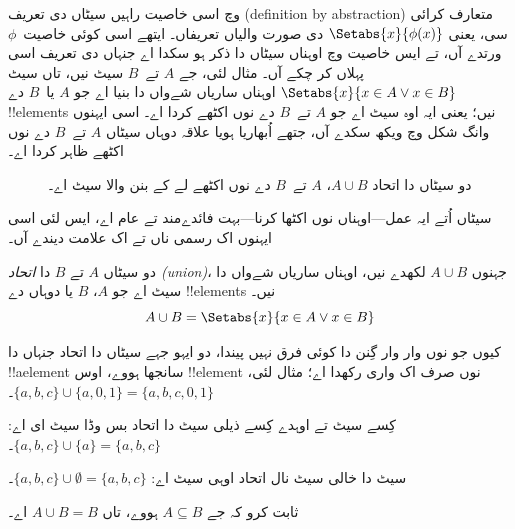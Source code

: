 \documentclass[../../../include/open-logic-section]{subfiles}
\begin{document}

\begin{explain}
 وچ اسی خاصیت راہیں سیٹاں دی تعریف
(definition by abstraction) متعارف کرائی
سی، یعنی $\Setabs{x}{\phi(x)}$ دی صورت والیاں تعریفاں۔ ایتھے اسی کوئی
خاصیت~$\phi$ ورتدے آں، تے ایس خاصیت وچ اوہناں سیٹاں دا ذکر ہو سکدا اے
جنہاں دی تعریف اسی پہلاں کر چکے آں۔ مثال لئی، جے $A$ تے~$B$ سیٹ نیں،
تاں سیٹ $\Setabs{x}{x \in A \lor x \in B}$ اوہناں ساریاں شےواں دا بنیا اے
جو $A$ یا~$B$ دے !!{element}s نیں؛ یعنی ایہ اوہ سیٹ اے جو $A$ تے~$B$ دے
 نوں اکٹھے کردا اے۔ اسی ایہنوں 
وانگ شکل وچ ویکھ سکدے آں، جتھے اُبھاریا ہویا علاقہ دوہاں سیٹاں $A$ تے~$B$
دے  نوں اکٹھے ظاہر کردا اے۔

\begin{figure}
  \caption{دو سیٹاں دا اتحاد $A \cup B$، $A$ تے~$B$ دے
    نوں اکٹھے لے کے بنن والا سیٹ اے۔}
\end{figure}

سیٹاں اُتے ایہ عمل---اوہناں نوں اکٹھا کرنا---بہت فائدےمند تے عام اے، ایس
لئی اسی ایہنوں اک رسمی ناں تے اک علامت دیندے آں۔
\end{explain}

\begin{defn}
دو سیٹاں $A$ تے $B$ دا \emph{اتحاد (union)}، جہنوں $A \cup B$ لکھدے نیں،
اوہناں ساریاں شےواں دا سیٹ اے جو $A$، $B$ یا دوہاں دے !!{element}s نیں۔
\[
A \cup B = \Setabs{x}{x \in A \lor x \in B}
\]
\end{defn}

\begin{ex}
کیوں جو  نوں وار وار گِنن دا کوئی فرق نہیں پیندا،
دو ایہو جہے سیٹاں دا اتحاد جنہاں دا !!a{element} سانجھا ہووے، اوس
!!{element} نوں صرف اک واری رکھدا اے؛ مثال لئی،
$\{ a, b, c\} \cup \{ a, 0, 1\} = \{a, b, c, 0, 1\}$۔

کِسے سیٹ تے اوہدے کِسے ذیلی سیٹ دا اتحاد بس وڈا سیٹ ای اے:
$\{a, b, c \} \cup \{a \} = \{a, b, c\}$۔

سیٹ دا خالی سیٹ نال اتحاد اوہی سیٹ اے:
$\{a, b, c \} \cup \emptyset = \{a, b, c \}$۔
\end{ex}

\begin{prob}
ثابت کرو کہ جے $A \subseteq B$ ہووے، تاں $A \cup B = B$ اے۔
\end{prob}
\end{document}
